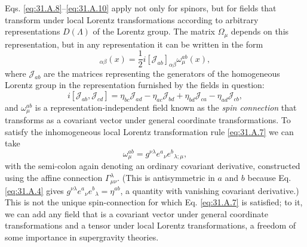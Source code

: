 Eqs. \eqref{eq:31.A.8}--\eqref{eq:31.A.10} apply not only for spinors,
but for fields that transform under local Lorentz transformations
according to arbitrary representations \(D(\Lambda)\) of the Lorentz
group. The matrix \(\Omega_\mu\) depends on this representation, but in
any representation it can be written in the form
\begin{equation}
  [\Omega_\mu]_{\alpha\beta}(x)
  =\frac{1}{2}i[\mathscr{J}_{ab}]_{\alpha\beta}\omega_\mu^{ab}(x),
  \tag{31.A.11}\label{eq:31.A.11}
\end{equation}
where \(\mathscr{J}_{ab}\) are the matrices representing the generators
of the homogeneous Lorentz group in the representation furnished by the
fields in question:
\begin{equation}
  i[\mathscr{J}_{ab},\mathscr{J}_{cd}]
  =\eta_{bc}\mathscr{J}_{ad}
   -\eta_{ac}\mathscr{J}_{bd}
   +\eta_{bd}\mathscr{J}_{ca}
   -\eta_{ad}\mathscr{J}_{cb},
  \tag{31.A.12}\label{eq:31.A.12}
\end{equation}
and \(\omega_\mu^{ab}\) is a representation-independent field known as
the \emph{spin connection} that transforms as a covariant vector under
general coordinate transformations. To satisfy the inhomogeneous local
Lorentz transformation rule \eqref{eq:31.A.7} we can take
\begin{equation}
  \omega_\mu^{ab}
  =g^{\nu\lambda}e^a{}_\nu e^b{}_{\lambda;\mu},
  \tag{31.A.13}\label{eq:31.A.13}
\end{equation}
with the semi-colon again denoting an ordinary covariant derivative,
constructed using the affine connection \(\Gamma^\lambda_{\mu\nu}\).
(This is antisymmetric in \(a\) and \(b\) because Eq.
\eqref{eq:31.A.4} gives
\(g^{\nu\lambda}e^a{}_\nu e^b{}_\lambda=\eta^{ab}\), a quantity with
vanishing covariant derivative.) This is not the unique spin-connection
for which Eq. \eqref{eq:31.A.7} is satisfied; to it, we can add any field
that is a covariant vector under general coordinate transformations and
a tensor under local Lorentz transformations, a freedom of some
importance in supergravity theories.

